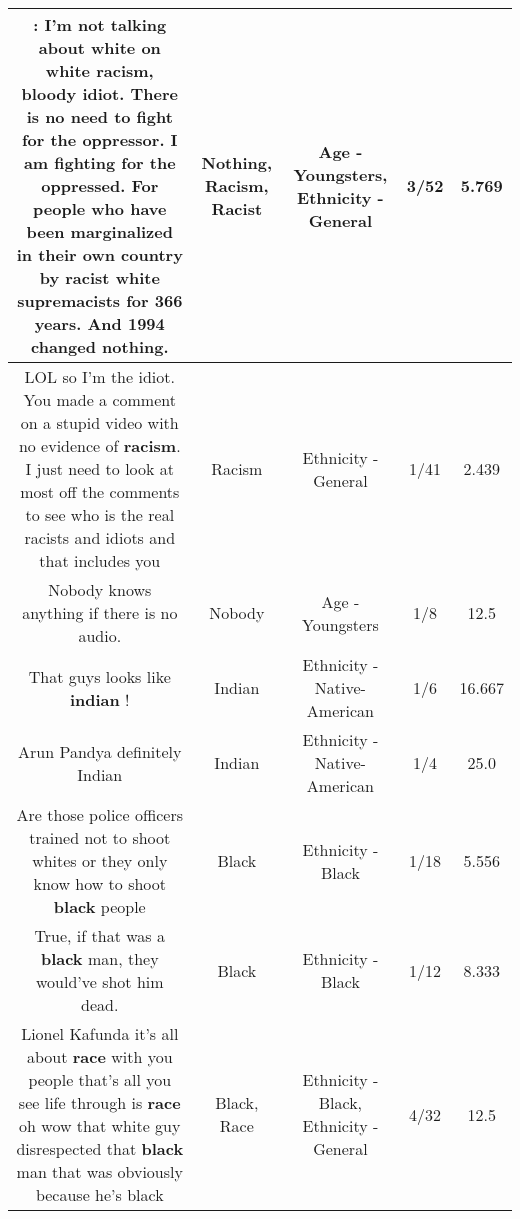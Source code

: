 \documentclass[11pt]{article}
\newlength\mylength
\begin{document}
\begin{center}
\begin{longtable}{|C{.65\mylength}|C{.30\mylength}|C{.12\mylength}|C{.12\mylength}|C{.12\mylength}|}
: I'm not talking about white on white \textbf{racism}, bloody idiot. There is no need to fight for the oppressor. I am fighting for the oppressed. For people who have been marginalized in their own country by \textbf{racist} white supremacists for 366 years. And 1994 changed \textbf{nothing}.\normalsize   & Nothing, Racism, Racist & Age - Youngsters, Ethnicity - General & 3/52 & 5.769 \\  \hline
  \small LOL so I'm the idiot. You made a comment on a stupid video with no evidence of \textbf{racism}. I just need to look at most off the comments to see who is the real racists and idiots and that includes you\normalsize   & Racism & Ethnicity - General & 1/41 & 2.439 \\  \hline
  \small Nobody knows anything if there is no audio.\normalsize   & Nobody & Age - Youngsters & 1/8 & 12.5 \\  \hline
  \small That guys looks like \textbf{indian} !\normalsize   & Indian & Ethnicity - Native-American & 1/6 & 16.667 \\  \hline
  \small Arun Pandya definitely Indian\normalsize   & Indian & Ethnicity - Native-American & 1/4 & 25.0 \\  \hline
  \small Are those police officers trained not to shoot whites or they only know how to shoot \textbf{black} people\normalsize   & Black & Ethnicity - Black & 1/18 & 5.556 \\  \hline
  \small True, if that was a \textbf{black} man, they would've shot him dead.\normalsize   & Black & Ethnicity - Black & 1/12 & 8.333 \\  \hline
  \small Lionel Kafunda it's all about \textbf{race} with you people that's all you see life through is \textbf{race} oh wow that white guy disrespected that \textbf{black} man that was obviously because he's black\normalsize   & Black, Race & Ethnicity - Black, Ethnicity - General & 4/32 & 12.5 \\  \hline

\end{longtable}
\end{center}
\end{document}
